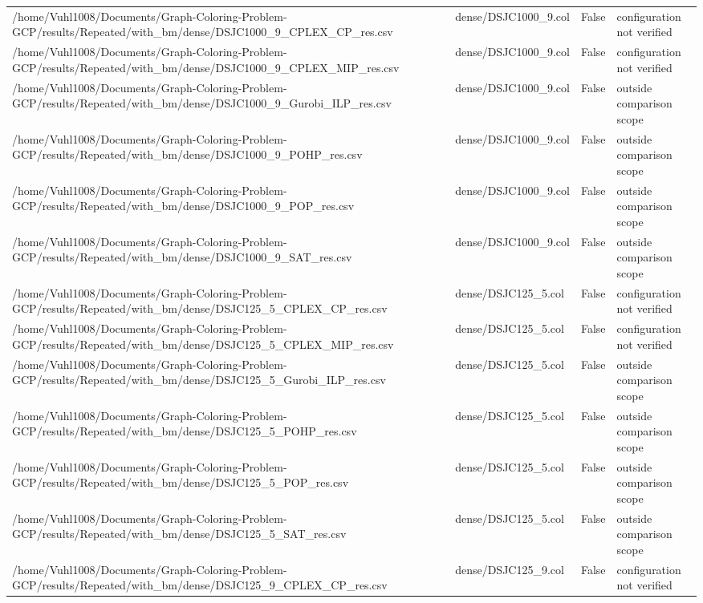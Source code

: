 \begin{table}[htbp]
\begin{tabular}{llll}
/home/Vuhl1008/Documents/Graph-Coloring-Problem-GCP/results/Repeated/with\_bm/dense/DSJC1000\_9\_CPLEX\_CP\_res.csv & dense/DSJC1000\_9.col & False & configuration not verified \\
/home/Vuhl1008/Documents/Graph-Coloring-Problem-GCP/results/Repeated/with\_bm/dense/DSJC1000\_9\_CPLEX\_MIP\_res.csv & dense/DSJC1000\_9.col & False & configuration not verified \\
/home/Vuhl1008/Documents/Graph-Coloring-Problem-GCP/results/Repeated/with\_bm/dense/DSJC1000\_9\_Gurobi\_ILP\_res.csv & dense/DSJC1000\_9.col & False & outside comparison scope \\
/home/Vuhl1008/Documents/Graph-Coloring-Problem-GCP/results/Repeated/with\_bm/dense/DSJC1000\_9\_POHP\_res.csv & dense/DSJC1000\_9.col & False & outside comparison scope \\
/home/Vuhl1008/Documents/Graph-Coloring-Problem-GCP/results/Repeated/with\_bm/dense/DSJC1000\_9\_POP\_res.csv & dense/DSJC1000\_9.col & False & outside comparison scope \\
/home/Vuhl1008/Documents/Graph-Coloring-Problem-GCP/results/Repeated/with\_bm/dense/DSJC1000\_9\_SAT\_res.csv & dense/DSJC1000\_9.col & False & outside comparison scope \\
/home/Vuhl1008/Documents/Graph-Coloring-Problem-GCP/results/Repeated/with\_bm/dense/DSJC125\_5\_CPLEX\_CP\_res.csv & dense/DSJC125\_5.col & False & configuration not verified \\
/home/Vuhl1008/Documents/Graph-Coloring-Problem-GCP/results/Repeated/with\_bm/dense/DSJC125\_5\_CPLEX\_MIP\_res.csv & dense/DSJC125\_5.col & False & configuration not verified \\
/home/Vuhl1008/Documents/Graph-Coloring-Problem-GCP/results/Repeated/with\_bm/dense/DSJC125\_5\_Gurobi\_ILP\_res.csv & dense/DSJC125\_5.col & False & outside comparison scope \\
/home/Vuhl1008/Documents/Graph-Coloring-Problem-GCP/results/Repeated/with\_bm/dense/DSJC125\_5\_POHP\_res.csv & dense/DSJC125\_5.col & False & outside comparison scope \\
/home/Vuhl1008/Documents/Graph-Coloring-Problem-GCP/results/Repeated/with\_bm/dense/DSJC125\_5\_POP\_res.csv & dense/DSJC125\_5.col & False & outside comparison scope \\
/home/Vuhl1008/Documents/Graph-Coloring-Problem-GCP/results/Repeated/with\_bm/dense/DSJC125\_5\_SAT\_res.csv & dense/DSJC125\_5.col & False & outside comparison scope \\
/home/Vuhl1008/Documents/Graph-Coloring-Problem-GCP/results/Repeated/with\_bm/dense/DSJC125\_9\_CPLEX\_CP\_res.csv & dense/DSJC125\_9.col & False & configuration not verified \\

\end{tabular}
\end{table}
